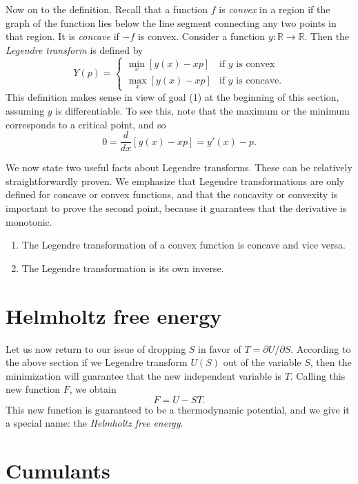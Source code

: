 Now on to the definition. Recall that a function $f$ is {\it convex}
 in a region if the graph of the function lies 
below the line segment connecting any two points in that region. It is 
{\it concave} if $-f$ is convex. Consider
a function $y:\mathbb{R}\to\mathbb{R}$. Then the 
{\it Legendre transform} is defined by
\begin{equation}
Y(p)=\begin{cases}
  \min_x [y(x)-xp] & \text{if $y$ is convex}\\
  \max_x [y(x)-xp] & \text{if $y$ is concave.}
\end{cases}
\end{equation}
This definition makes sense in view of goal (1) at the beginning of this
section, assuming $y$ is differentiable. To see this, note that the maximum
or the minimum corresponds to a critical point, and so
\begin{equation}\label{eq:legendremin}
  0=\frac{d}{dx}\left[y(x)-xp\right]=y'(x)-p.
\end{equation}

We now state two useful facts about Legendre transforms. These can
be relatively straightforwardly proven. We emphasize that Legendre
transformations are only defined for concave or convex functions, and
that the concavity or convexity is important to prove the second point,
because it guarantees that the derivative is monotonic.
\begin{proposition}{}{}
  \begin{enumerate}
    \item The Legendre transformation of a convex function is concave
          and vice versa.
    \item The Legendre transformation is its own inverse.
  \end{enumerate}
\end{proposition}

\section{Helmholtz free energy}
Let us now return to our issue of dropping $S$ in favor
of $T=\partial U/\partial S$. According to the above section if we
Legendre transform $U(S)$ out of the variable $S$, then the minimization
will guarantee that the new independent variable is $T$. Calling
this new function $F$, we obtain
\begin{equation}
  F=U-ST.
\end{equation}
This new function is guaranteed to be a thermodynamic potential, and
we give it a special name: the {\it Helmholtz free energy}.


\section{Cumulants}





